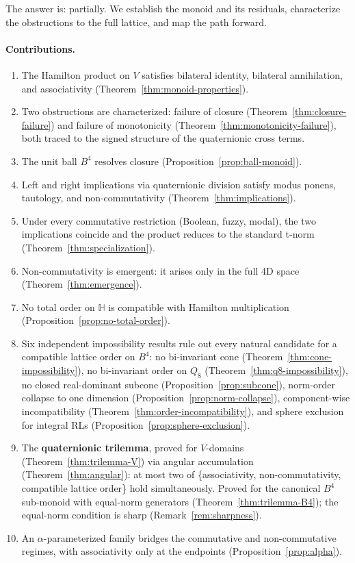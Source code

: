 \documentclass[11pt,a4paper]{article}
\newcommand{\Hq}{\mathbb{H}}
\begin{document}
The answer is: partially. We establish the monoid and its residuals,
characterize the obstructions to the full lattice, and map the path
forward.

\paragraph{Contributions.}
\begin{enumerate}[nosep]
\item The Hamilton product on $V$ satisfies bilateral identity,
  bilateral annihilation, and associativity
  (Theorem~\ref{thm:monoid-properties}).
\item Two obstructions are characterized: failure of closure
  (Theorem~\ref{thm:closure-failure}) and failure of monotonicity
  (Theorem~\ref{thm:monotonicity-failure}), both traced to the signed
  structure of the quaternionic cross terms.
\item The unit ball $B^4$ resolves closure
  (Proposition~\ref{prop:ball-monoid}).
\item Left and right implications via quaternionic division satisfy modus
  ponens, tautology, and non-commutativity
  (Theorem~\ref{thm:implications}).
\item Under every commutative restriction (Boolean, fuzzy, modal), the
  two implications coincide and the product reduces to the standard
  t-norm (Theorem~\ref{thm:specialization}).
\item Non-commutativity is emergent: it arises only in the full 4D
  space (Theorem~\ref{thm:emergence}).
\item No total order on $\Hq$ is compatible with Hamilton multiplication
  (Proposition~\ref{prop:no-total-order}).
\item Six independent impossibility results rule out every natural
  candidate for a compatible lattice order on $B^4$: no bi-invariant
  cone (Theorem~\ref{thm:cone-impossibility}), no bi-invariant order
  on $Q_8$ (Theorem~\ref{thm:q8-impossibility}), no closed
  real-dominant subcone (Proposition~\ref{prop:subcone}),
  norm-order collapse to one dimension
  (Proposition~\ref{prop:norm-collapse}), component-wise
  incompatibility (Theorem~\ref{thm:order-incompatibility}), and
  sphere exclusion for integral RLs
  (Proposition~\ref{prop:sphere-exclusion}).
\item The \textbf{quaternionic trilemma}, proved for $V$-domains
  (Theorem~\ref{thm:trilemma-V}) via angular accumulation
  (Theorem~\ref{thm:angular}): at most two of \{associativity,
  non-commutativity, compatible lattice order\} hold simultaneously.
  Proved for the canonical $B^4$ sub-monoid with equal-norm
  generators (Theorem~\ref{thm:trilemma-B4}); the equal-norm
  condition is sharp (Remark~\ref{rem:sharpness}).
\item An $\alpha$-parameterized family bridges the commutative and
  non-commutative regimes, with associativity only at the endpoints
  (Proposition~\ref{prop:alpha}).
\end{enumerate}
\end{document}
